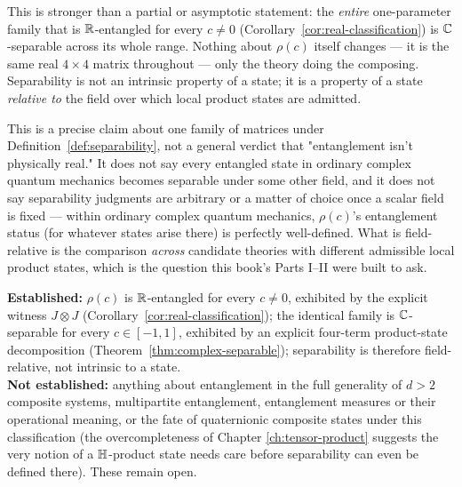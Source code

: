 \begin{remark}
This is stronger than a partial or asymptotic statement: the \emph{entire}
one-parameter family that is $\mathbb{R}$-entangled for every $c\ne0$
(Corollary~\ref{cor:real-classification}) is $\mathbb{C}$-separable across its whole
range. Nothing about $\rho(c)$ itself changes — it is the same real $4\times4$
matrix throughout — only the theory doing the composing. Separability is not
an intrinsic property of a state; it is a property of a state \emph{relative
to} the field over which local product states are admitted.
\end{remark}

\begin{scopebox}
\scopetitle{}This is a precise claim about one family of matrices under
Definition~\ref{def:separability}, not a general verdict that "entanglement
isn't physically real." It does not say every entangled state in ordinary
complex quantum mechanics becomes separable under some other field, and it
does not say separability judgments are arbitrary or a matter of choice
once a scalar field is fixed — within ordinary complex quantum mechanics,
$\rho(c)$'s entanglement status (for whatever states arise there) is
perfectly well-defined. What is field-relative is the comparison
\emph{across} candidate theories with different admissible local product
states, which is the question this book's Parts I--II were built to ask.
\end{scopebox}

\begin{ledgerentry}
\textbf{Established:} $\rho(c)$ is $\mathbb{R}$-entangled for every $c\ne0$, exhibited
by the explicit witness $J\otimes J$ (Corollary~\ref{cor:real-classification});
the identical family is $\mathbb{C}$-separable for every $c\in[-1,1]$, exhibited by an
explicit four-term product-state decomposition
(Theorem~\ref{thm:complex-separable}); separability is therefore
field-relative, not intrinsic to a state.\\
\textbf{Not established:} anything about entanglement in the full generality
of $d>2$ composite systems, multipartite entanglement, entanglement measures
or their operational meaning, or the fate of quaternionic composite states
under this classification (the overcompleteness of Chapter
\ref{ch:tensor-product} suggests the very notion of a $\mathbb{H}$-product state
needs care before separability can even be defined there). These remain open.
\end{ledgerentry}
